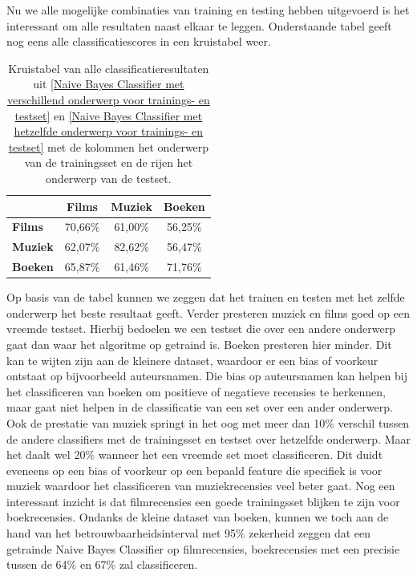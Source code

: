 Nu we alle mogelijke combinaties van training en testing hebben uitgevoerd is het interessant om alle resultaten naast elkaar te leggen. Onderstaande tabel geeft nog eens alle classificatiescores in een kruistabel weer.

\begin{table}[h]
\centering
\begin{tabular}{l|c|c|c|}
\cline{2-4}
                                      & \textbf{Films} & \textbf{Muziek} & \textbf{Boeken} \\ \hline
\multicolumn{1}{|l|}{\textbf{Films}} & 70,66\%         & 61,00\%         & 56,25\%         \\ \hline
\multicolumn{1}{|l|}{\textbf{Muziek}} & 62,07\%         & 82,62\%         & 56,47\%         \\ \hline
\multicolumn{1}{|l|}{\textbf{Boeken}} & 65,87\%         & 61,46\%         & 71,76\%         \\ \hline
\end{tabular}
\label{tab:alles}
\caption{Kruistabel van alle classificatieresultaten uit \ref{Naive Bayes Classifier met verschillend onderwerp voor trainings- en testset} en \ref{Naive Bayes Classifier met hetzelfde onderwerp voor trainings- en testset} met de kolommen het onderwerp van de trainingsset en de rijen het onderwerp van de testset.} 
\end{table}


Op basis van de tabel kunnen we zeggen dat het trainen en testen met het zelfde onderwerp het beste resultaat geeft. Verder presteren muziek en films goed op een vreemde testset. Hierbij bedoelen we een testset die over een andere onderwerp gaat dan waar het algoritme op getraind is.  Boeken presteren hier minder. Dit kan te wijten zijn aan de kleinere dataset, waardoor er een bias of voorkeur ontstaat op bijvoorbeeld auteursnamen. Die bias op auteursnamen kan helpen bij het classificeren van boeken om positieve of negatieve recensies te herkennen, maar gaat niet helpen in de classificatie van een set over een ander onderwerp. Ook de prestatie van muziek springt in het oog met meer dan 10\% verschil tussen de andere classifiers met de trainingsset en testset over hetzelfde onderwerp. Maar het daalt wel 20\% wanneer het een vreemde set moet classificeren. Dit duidt eveneens op een bias of voorkeur op een bepaald feature die specifiek is voor muziek waardoor het classificeren van muziekrecensies veel beter gaat. Nog een interessant inzicht is dat filmrecensies een goede trainingsset blijken te zijn voor boekrecensies.  Ondanks de kleine dataset van boeken, kunnen we toch aan de hand van het betrouwbaarheidsinterval met 95\% zekerheid zeggen dat een getrainde Naive Bayes Classifier op filmrecensies, boekrecensies met een precisie tussen de 64\% en 67\% zal classificeren.\\

